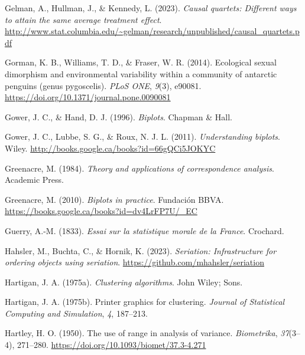 \documentclass[
  letterpaper,
  10pt,
  krantz2]{krantz}
\newlength{\cslhangindent}
\newlength{\cslentryspacingunit} %
\newenvironment{CSLReferences}[2] %
 {%
  \setlength{\parindent}{0pt}
  \ifodd #1
  \let\oldpar\par
  \def\par{\hangindent=\cslhangindent\oldpar}
  \fi
  \setlength{\parskip}{#2\cslentryspacingunit}
 }%
 {}
\begin{document}
\begin{CSLReferences}{1}{0}
\leavevmode{}%
Gelman, A., Hullman, J., \& Kennedy, L. (2023). \emph{Causal quartets:
Different ways to attain the same average treatment effect}.
\url{http://www.stat.columbia.edu/~gelman/research/unpublished/causal_quartets.pdf}

\leavevmode{}%
Gorman, K. B., Williams, T. D., \& Fraser, W. R. (2014). Ecological
sexual dimorphism and environmental variability within a community of
antarctic penguins (genus pygoscelis). \emph{{PLoS} {ONE}}, \emph{9}(3),
e90081. \url{https://doi.org/10.1371/journal.pone.0090081}

\leavevmode{}%
Gower, J. C., \& Hand, D. J. (1996). \emph{Biplots}. Chapman \& Hall.

\leavevmode{}%
Gower, J. C., Lubbe, S. G., \& Roux, N. J. L. (2011).
\emph{Understanding biplots}. Wiley.
\url{http://books.google.ca/books?id=66gQCi5JOKYC}

\leavevmode{}%
Greenacre, M. (1984). \emph{Theory and applications of correspondence
analysis}. Academic Press.

\leavevmode{}%
Greenacre, M. (2010). \emph{Biplots in practice}. Fundaci{ó}n BBVA.
\url{https://books.google.ca/books?id=dv4LrFP7U/_EC}

\leavevmode{}%
Guerry, A.-M. (1833). \emph{Essai sur la statistique morale de la
{France}}. Crochard.

\leavevmode{}%
Hahsler, M., Buchta, C., \& Hornik, K. (2023). \emph{Seriation:
Infrastructure for ordering objects using seriation}.
\url{https://github.com/mhahsler/seriation}

\leavevmode{}%
Hartigan, J. A. (1975a). \emph{Clustering algorithms}. John Wiley; Sons.

\leavevmode{}%
Hartigan, J. A. (1975b). Printer graphics for clustering. \emph{Journal
of Statistical Computing and Simulation}, \emph{4}, 187--213.

\leavevmode{}%
Hartley, H. O. (1950). The use of range in analysis of variance.
\emph{Biometrika}, \emph{37}(3--4), 271--280.
\url{https://doi.org/10.1093/biomet/37.3-4.271}


\end{CSLReferences}
\end{document}
